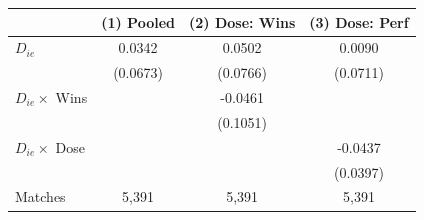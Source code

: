 \begin{tabular}{lccc}
\toprule
 & (1) Pooled & (2) Dose: Wins & (3) Dose: Perf \\
\midrule
$D_{ie}$ & 0.0342 & 0.0502 & 0.0090 \\
 & (0.0673) & (0.0766) & (0.0711) \\
$D_{ie} \times$ Wins &  & -0.0461 &  \\
 &  & (0.1051) &  \\
$D_{ie} \times$ Dose &  &  & -0.0437 \\
 &  &  & (0.0397) \\
\midrule
Matches & 5,391 & 5,391 & 5,391 \\
\bottomrule
\end{tabular}
